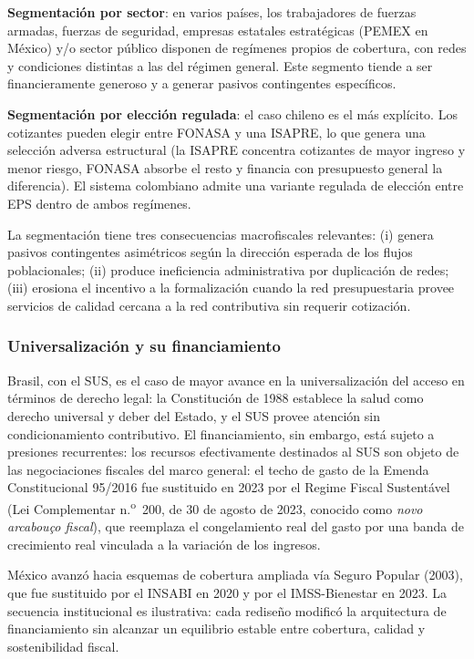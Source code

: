 \documentclass[12pt, letterpaper]{article}
\begin{document}
\textbf{Segmentación por sector}: en varios países, los trabajadores de
fuerzas armadas, fuerzas de seguridad, empresas estatales estratégicas (PEMEX en
México) y/o sector público disponen de regímenes propios de cobertura, con redes y
condiciones distintas a las del régimen general. Este segmento tiende a ser
financieramente generoso y a generar pasivos contingentes específicos.

\textbf{Segmentación por elección regulada}: el caso chileno es el más explícito.
Los cotizantes pueden elegir entre FONASA y una ISAPRE, lo que genera una selección
adversa estructural (la ISAPRE concentra cotizantes de mayor ingreso y menor riesgo,
FONASA absorbe el resto y financia con presupuesto general la diferencia). El
sistema colombiano admite una variante regulada de elección entre EPS dentro de
ambos regímenes.

La segmentación tiene tres consecuencias macrofiscales relevantes: (i) genera
pasivos contingentes asimétricos según la dirección esperada de los flujos
poblacionales; (ii) produce ineficiencia administrativa por duplicación de redes;
(iii) erosiona el incentivo a la formalización cuando la red presupuestaria provee
servicios de calidad cercana a la red contributiva sin requerir cotización.

\subsubsection{Universalización y su financiamiento}

Brasil, con el SUS, es el caso de mayor avance en la universalización del acceso
en términos de derecho legal: la Constitución de 1988 establece la salud como
derecho universal y deber del Estado, y el SUS provee atención sin condicionamiento
contributivo. El financiamiento, sin embargo, está sujeto a presiones recurrentes:
los recursos efectivamente destinados al SUS son objeto de las negociaciones
fiscales del marco general: el techo de gasto de la Emenda Constitucional 95/2016
fue sustituido en 2023 por el Regime Fiscal Sustentável (Lei Complementar
n.\textsuperscript{o}~200, de 30 de agosto de 2023, conocido como \textit{novo
arcabouço fiscal}), que reemplaza el congelamiento real del gasto por una banda de
crecimiento real vinculada a la variación de los ingresos.

México avanzó hacia esquemas de cobertura ampliada vía Seguro Popular (2003), que
fue sustituido por el INSABI en 2020 y por el IMSS-Bienestar en 2023. La
secuencia institucional es ilustrativa: cada rediseño modificó la arquitectura de
financiamiento sin alcanzar un equilibrio estable entre cobertura, calidad y
sostenibilidad fiscal.
\end{document}
